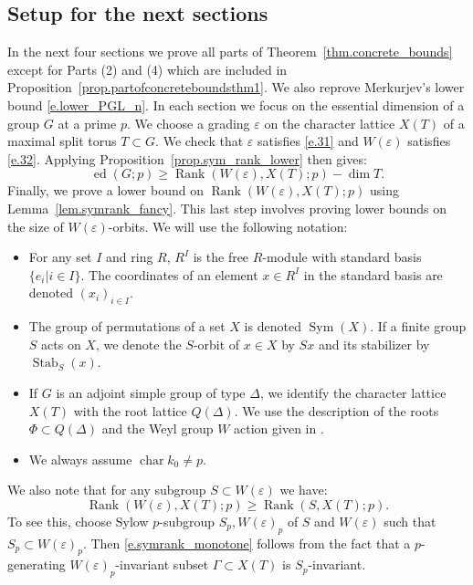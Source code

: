 \documentclass[12pt]{amsart}
\numberwithin{equation}{section}
\theoremstyle{definition}
\newcommand{\Sym}{\operatorname{Sym}}
\newcommand{\ed}{\operatorname{ed}}
\newcommand{\SymRank}{\operatorname{Rank}}
\newcommand{\Char}{\operatorname{char}}
\newcommand{\Stab}{\operatorname{Stab}}
\newcommand{\eps}{\varepsilon}
\begin{document}
\subsection{Setup for the next sections}
In the next four sections we prove all parts of Theorem~\ref{thm.concrete_bounds} except for Parts (2) and (4) which are included in Proposition~\ref{prop.partofconcreteboundsthm1}. We also reprove Merkurjev's lower bound \eqref{e.lower_PGL_n}. In each section we focus on the essential dimension of a group $G$ at a prime $p$. We choose a grading $\eps$ on the character lattice $X(T)$ of a maximal split torus $T\subset G$. We check that $\eps$ satisfies \eqref{e.31} and $W(\eps)$ satisfies \eqref{e.32}. Applying Proposition~\ref{prop.sym_rank_lower} then gives:
$$\ed(G;p) \geq \SymRank(W(\eps),X(T);p) - \dim T.$$
Finally, we prove a lower bound on $\SymRank(W(\eps),X(T);p)$ using  Lemma~\ref{lem.symrank_fancy}. This last step involves proving lower bounds on the size of $W(\eps)$-orbits. We will use the following notation:
\begin{itemize}
    \item For any set $I$ and ring $R$, $R^I$ is the free $R$-module with standard basis $\{e_i | i\in I \}$. The coordinates of an element $x\in R^I$ in the standard basis are denoted $(x_i)_{i\in I}$.

    \item  The group of permutations of a set $X$ is denoted $\Sym(X)$. If a finite group $S$ acts on $X$, we denote the $S$-orbit of $x\in X$ by $S x$ and its stabilizer by $\Stab_{S}(x)$.
    
    \item If $G$ is an adjoint simple group of type $\Delta$, we identify the character lattice $X(T)$ with the root lattice $Q(\Delta)$. We use the description of the roots $\Phi\subset Q(\Delta)$ and the Weyl group $W$ action given in \cite{conway2013sphere}.

    \item We always assume $\Char k_0\neq p$.
 
\end{itemize}

We also note that for any subgroup $S \subset W(\eps)$ we have:
\begin{equation}\label{e.symrank_monotone}
    \SymRank(W(\eps),X(T);p) \geq \SymRank(S,X(T);p).
\end{equation}
To see this, choose Sylow $p$-subgroup $S_p, W(\eps)_p$ of $S$ and $W(\eps)$ such that $S_p \subset W(\eps)_p$. Then \eqref{e.symrank_monotone} follows from the fact that a $p$-generating $W(\eps)_p$-invariant subset $\Gamma\subset X(T)$ is $S_p$-invariant.
\end{document}
